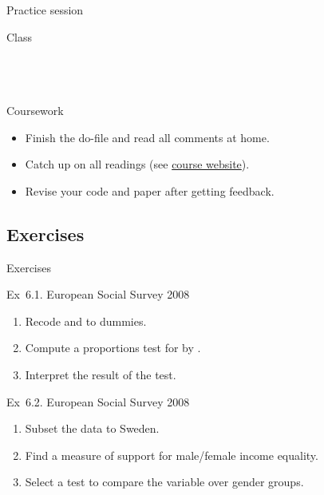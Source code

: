 \documentclass[t]{beamer}
\begin{document}
	\begin{frame}[t]{Practice session}

    \begin{block}{Class}
      \\
      \\
      
			\\
			\\    
    \end{block}

    \begin{alertblock}{Coursework}
      \begin{itemize}
	       \item Finish the do-file and read all comments at home.
	       \item Catch up on all readings %
				 	(see \href{http://f.briatte.org/teaching/quanti/}%
				 	{course website}).
	       \item Revise your code and paper after getting feedback.
      \end{itemize}
    \end{alertblock}
    		
	\end{frame}
	
  \subsection{Exercises}
  
  \begin{frame}{Exercises}

    \begin{exampleblock}{Ex~6.1. European Social Survey 2008}
      \begin{enumerate}
        \item Recode  and  to dummies.
        \item Compute a proportions test for  by .
        \item Interpret the result of the test.
      \end{enumerate}
    \end{exampleblock}

    \begin{exampleblock}{Ex~6.2. European Social Survey 2008}
      \begin{enumerate}
        \item Subset the data to Sweden.
        \item Find a measure of support for male/female income equality.
        \item Select a test to compare the variable over gender groups.
      \end{enumerate}
    \end{exampleblock}

  \end{frame}
	
\end{document}
